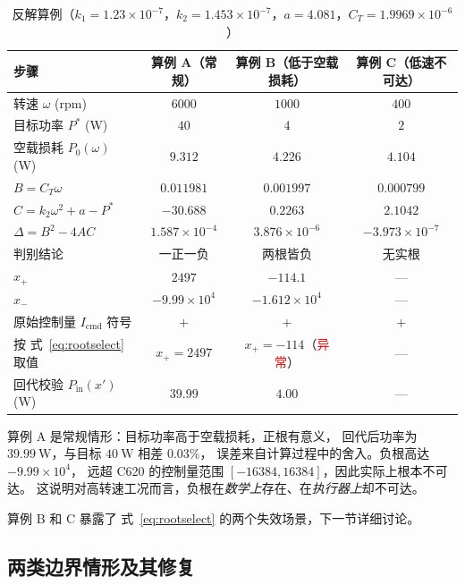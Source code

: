 \documentclass[cn,blue,11pt,device=normal]{elegantnote}
\newcommand{\Pin}{P_{\mathrm{in}}{}}
\newcommand{\Icmd}{I_{\mathrm{cmd}}{}}
\newcommand{\CT}{C_{T}{}}
\newcommand{\fref}[1]{式~\eqref{#1}}
\begin{document}
\begin{table}[htbp]
  \centering
  \small
  \caption{反解算例（$k_1=1.23\times10^{-7}$，$k_2=1.453\times10^{-7}$，$a=4.081$，$\CT=1.9969\times10^{-6}$）}
  \label{tab:example}
  \begin{tabular}{@{}lccc@{}}
    \toprule
    步骤 & 算例 A（常规） & 算例 B（低于空载损耗） & 算例 C（低速不可达） \\
    \midrule
    转速 $\omega$ (rpm)              & $6000$ & $1000$ & $400$ \\
    目标功率 $P^{\ast}$ (W)          & $40$   & $4$    & $2$ \\
    空载损耗 $P_0(\omega)$ (W)       & $9.312$ & $4.226$ & $4.104$ \\
    $B=\CT\omega$                    & $0.011981$ & $0.001997$ & $0.000799$ \\
    $C=k_2\omega^2+a-P^{\ast}$       & $-30.688$ & $0.2263$ & $2.1042$ \\
    $\Delta=B^2-4AC$                 & $1.587\times10^{-4}$ & $3.876\times10^{-6}$ & $-3.973\times10^{-7}$ \\
    判别结论                          & 一正一负 & 两根皆负 & 无实根 \\
    $x_+$                            & $2497$ & $-114.1$ & --- \\
    $x_-$                            & $-9.99\times10^{4}$ & $-1.612\times10^{4}$ & --- \\
    原始控制量 $\Icmd$ 符号          & $+$ & $+$ & $+$ \\
    按 \fref{eq:rootselect} 取值     & $x_+=2497$ & $x_+=-114$（\textcolor{red}{异常}） & --- \\
    \midrule
    回代校验 $\Pin(x')$ (W)          & $39.99$ & $4.00$ & --- \\
    \bottomrule
  \end{tabular}
\end{table}

算例 A 是常规情形：目标功率高于空载损耗，正根有意义，
回代后功率为 $39.99\ \mathrm{W}$，与目标 $40\ \mathrm{W}$ 相差 $0.03\%$，
误差来自计算过程中的舍入。负根高达 $-9.99\times10^4$，
远超 C620 的控制量范围 $[-16384,16384]$，因此实际上根本不可达。
这说明对高转速工况而言，负根在\emph{数学上}存在、在\emph{执行器上}却不可达。

算例 B 和 C 暴露了 \fref{eq:rootselect} 的两个失效场景，下一节详细讨论。


\subsection{两类边界情形及其修复}
\end{document}
